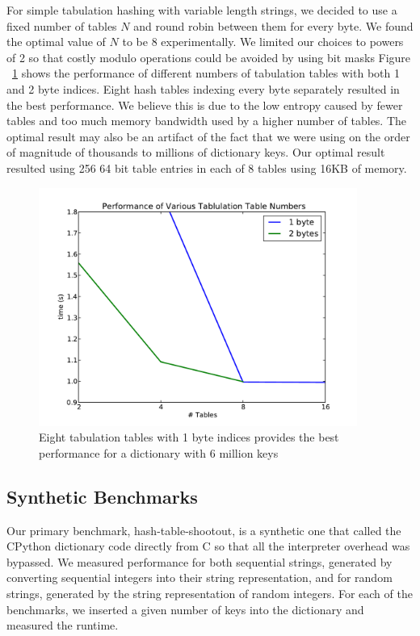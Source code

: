 \documentclass[11pt]{article}
\begin{document}
For simple tabulation hashing with variable length strings, we decided to use a
fixed number of tables $N$ and round robin between them for every byte.  We
found the optimal value of $N$ to be 8 experimentally.  We limited our choices
to powers of 2 so that costly modulo operations could be avoided by using bit
masks Figure ~\ref{fig:tables} shows the performance of different numbers of
tabulation tables with both 1 and 2 byte indices.  Eight hash tables indexing
every byte separately resulted in the best performance.    We believe this is due
to the low entropy caused by fewer tables and too much memory bandwidth used by a higher
number of tables.  The optimal result may also be an artifact of the fact that
we were using on the order of magnitude of thousands to millions of dictionary
keys.  Our optimal result resulted using 256 64
bit table entries in each of 8 tables using 16KB of memory.
 \begin{figure}[H]
   \centering
   \includegraphics[width=4.1in]{tables.pdf}
   \caption{Eight tabulation tables with 1 byte indices provides the best performance for a
   dictionary with 6 million keys}
   \label{fig:tables}
 \end{figure}
       

\subsection{Synthetic Benchmarks}

Our primary benchmark, hash-table-shootout, is a synthetic one that called the CPython dictionary
code directly from C so that all the interpreter overhead was bypassed.  We
measured performance for both sequential strings, generated by converting
sequential integers into their string representation, and for random strings,
generated by the string representation of random integers.  For each of the
benchmarks, we inserted a given number of keys into the dictionary and measured
the runtime.
\end{document}
